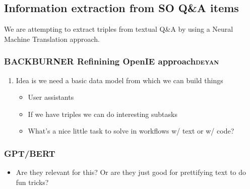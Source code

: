 \documentclass[11pt]{article}
\begin{document}
\subsection{Information extraction from SO Q\&A items}
\label{sec:orga77b2d9}
We are attempting to extract triples from textual Q\&A by using a
Neural Machine Translation approach.

\subsubsection{{\bfseries\sffamily BACKBURNER} Refinining OpenIE approach\hfill{}\textsc{deyan}}
\label{sec:org07cd4f4}

\begin{enumerate}
\item Idea is we need a basic data model from which we can build things
\label{sec:orgadc9c15}

\begin{itemize}
\item User assistants
\item If we have triples we can do interesting subtasks
\item What’s a nice little task to solve in workflows w/ text or w/ code?
\end{itemize}
\end{enumerate}

\subsubsection{GPT/BERT}
\label{sec:org0a67cf6}

\begin{itemize}
\item Are they relevant for this? Or are they just good for prettifying
text to do fun tricks?
\end{itemize}
\end{document}

